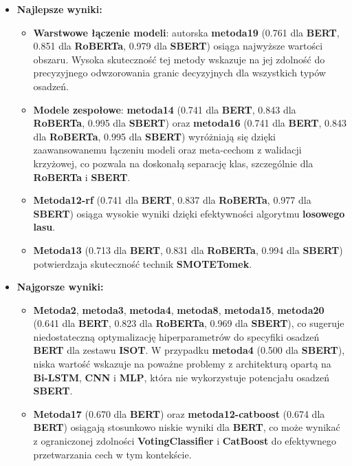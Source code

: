 \begin{itemize}
	\item \textbf{Najlepsze wyniki:}
	      \begin{itemize}
		      \item \textbf{Warstwowe łączenie modeli}: autorska \textbf{metoda19} (0.761 dla \textbf{BERT}, 0.851 dla \textbf{RoBERTa}, 0.979 dla \textbf{SBERT}) osiąga najwyższe wartości obszaru. Wysoka skuteczność tej metody wskazuje na jej zdolność do precyzyjnego odwzorowania granic decyzyjnych dla wszystkich typów osadzeń.
		      \item \textbf{Modele zespołowe}: \textbf{metoda14} (0.741 dla \textbf{BERT}, 0.843 dla \textbf{RoBERTa}, 0.995 dla \textbf{SBERT}) oraz \textbf{metoda16} (0.741 dla \textbf{BERT}, 0.843 dla \textbf{RoBERTa}, 0.995 dla \textbf{SBERT}) wyróżniają się dzięki zaawansowanemu łączeniu modeli oraz meta-cechom z walidacji krzyżowej, co pozwala na doskonałą separację klas, szczególnie dla \textbf{RoBERTa} i \textbf{SBERT}.
		      \item \textbf{Metoda12-rf} (0.741 dla \textbf{BERT}, 0.837 dla \textbf{RoBERTa}, 0.977 dla \textbf{SBERT}) osiąga wysokie wyniki dzięki efektywności algorytmu \textbf{losowego lasu}.
		      \item \textbf{Metoda13} (0.713 dla \textbf{BERT}, 0.831 dla \textbf{RoBERTa}, 0.994 dla \textbf{SBERT}) potwierdzaja skuteczność technik \textbf{SMOTETomek}.
	      \end{itemize}
	\item \textbf{Najgorsze wyniki:}
	      \begin{itemize}
		      \item \textbf{Metoda2}, \textbf{metoda3}, \textbf{metoda4}, \textbf{metoda8}, \textbf{metoda15}, \textbf{metoda20} (0.641 dla \textbf{BERT}, 0.823 dla \textbf{RoBERTa}, 0.969 dla \textbf{SBERT}), co sugeruje niedostateczną optymalizację hiperparametrów do specyfiki osadzeń \textbf{BERT} dla zestawu \textbf{ISOT}. W przypadku \textbf{metoda4} (0.500 dla \textbf{SBERT}), niska wartość wskazuje na poważne problemy z architekturą opartą na \textbf{Bi-LSTM}, \textbf{CNN} i \textbf{MLP}, która nie wykorzystuje potencjału osadzeń \textbf{SBERT}.
		      \item \textbf{Metoda17} (0.670 dla \textbf{BERT}) oraz \textbf{metoda12-catboost} (0.674 dla \textbf{BERT}) osiągają stosunkowo niskie wyniki dla \textbf{BERT}, co może wynikać z ograniczonej zdolności \textbf{VotingClassifier} i \textbf{CatBoost} do efektywnego przetwarzania cech w tym kontekście.
	      \end{itemize}
\end{itemize}

